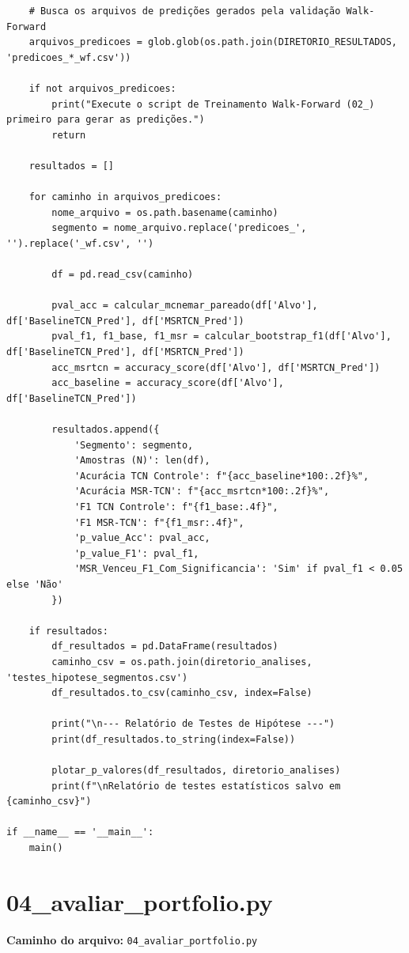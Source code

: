 \documentclass{article}
\begin{document}
\begin{verbatim}
    # Busca os arquivos de predições gerados pela validação Walk-Forward
    arquivos_predicoes = glob.glob(os.path.join(DIRETORIO_RESULTADOS, 'predicoes_*_wf.csv'))
    
    if not arquivos_predicoes:
        print("Execute o script de Treinamento Walk-Forward (02_) primeiro para gerar as predições.")
        return
        
    resultados = []
    
    for caminho in arquivos_predicoes:
        nome_arquivo = os.path.basename(caminho)
        segmento = nome_arquivo.replace('predicoes_', '').replace('_wf.csv', '')
        
        df = pd.read_csv(caminho)
            
        pval_acc = calcular_mcnemar_pareado(df['Alvo'], df['BaselineTCN_Pred'], df['MSRTCN_Pred'])
        pval_f1, f1_base, f1_msr = calcular_bootstrap_f1(df['Alvo'], df['BaselineTCN_Pred'], df['MSRTCN_Pred'])
        acc_msrtcn = accuracy_score(df['Alvo'], df['MSRTCN_Pred'])
        acc_baseline = accuracy_score(df['Alvo'], df['BaselineTCN_Pred'])
        
        resultados.append({
            'Segmento': segmento,
            'Amostras (N)': len(df),
            'Acurácia TCN Controle': f"{acc_baseline*100:.2f}%",
            'Acurácia MSR-TCN': f"{acc_msrtcn*100:.2f}%",
            'F1 TCN Controle': f"{f1_base:.4f}",
            'F1 MSR-TCN': f"{f1_msr:.4f}",
            'p_value_Acc': pval_acc,
            'p_value_F1': pval_f1,
            'MSR_Venceu_F1_Com_Significancia': 'Sim' if pval_f1 < 0.05 else 'Não'
        })
        
    if resultados:
        df_resultados = pd.DataFrame(resultados)
        caminho_csv = os.path.join(diretorio_analises, 'testes_hipotese_segmentos.csv')
        df_resultados.to_csv(caminho_csv, index=False)
        
        print("\n--- Relatório de Testes de Hipótese ---")
        print(df_resultados.to_string(index=False))
        
        plotar_p_valores(df_resultados, diretorio_analises)
        print(f"\nRelatório de testes estatísticos salvo em {caminho_csv}")

if __name__ == '__main__':
    main()
\end{verbatim}

\newpage

\section{04\_avaliar\_portfolio.py}
\textbf{Caminho do arquivo:} \texttt{04\_avaliar\_portfolio.py}
\end{document}
